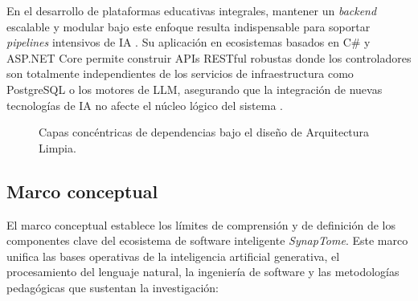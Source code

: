 En el desarrollo de plataformas educativas integrales, mantener un \textit{backend} 
escalable y modular bajo este enfoque resulta indispensable para soportar 
\textit{pipelines} intensivos de IA \textcite{Upadhyay2026, Solanki2026}. Su 
aplicación en ecosistemas basados en C\# y ASP.NET Core permite construir APIs 
RESTful robustas donde los controladores son totalmente independientes de los 
servicios de infraestructura como PostgreSQL o los motores de LLM, asegurando que 
la integración de nuevas tecnologías de IA no afecte el núcleo lógico del sistema 
\parencite{Afian2025}.

\begin{figure}[H]
    \centering
    \caption{Capas concéntricas de dependencias bajo el diseño de Arquitectura Limpia.}
    \label{fig:clean_architecture_layers}
\end{figure}

\subsection{Marco conceptual}

El marco conceptual establece los límites de comprensión y de definición de los componentes clave del ecosistema de software inteligente \textit{SynapTome}. Este marco unifica las bases operativas de la inteligencia artificial generativa, el procesamiento del lenguaje natural, la ingeniería de software y las metodologías pedagógicas que sustentan la investigación:

